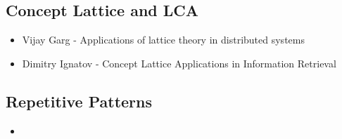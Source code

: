 \subsection{Concept Lattice and LCA}


\begin{itemize}
\item Vijay Garg - Applications of lattice theory in distributed systems

\item Dimitry Ignatov \cite{ignatov} - Concept Lattice Applications in Information Retrieval
\end{itemize}

\subsection{Repetitive Patterns}


\begin{itemize}
\item 
\end{itemize}


